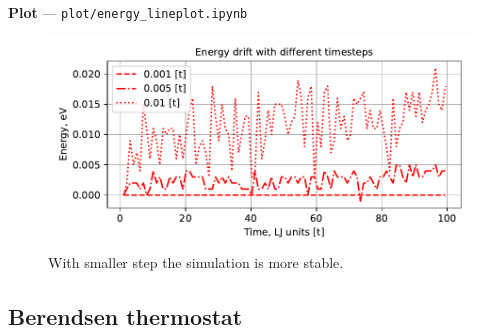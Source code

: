 \documentclass[12pt,a4paper]{article}
\begin{document}
{\bf Plot} --- \verb|plot/energy_lineplot.ipynb|

\begin{figure}[htb]
	\centering
	\includegraphics[width=.7\linewidth]{img/milestone04-total.pdf}
	\caption{With smaller step the simulation is more stable.}
	\label{fig:first_simulation}
\end{figure}


\subsection*{Berendsen thermostat}
\end{document}
